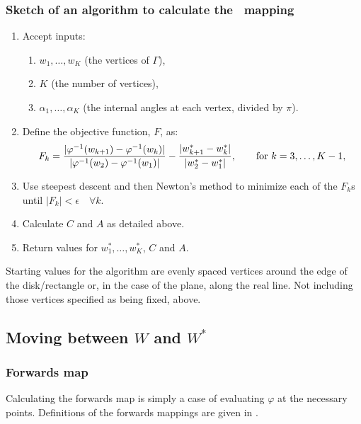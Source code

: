 \subsubsection{Sketch of an algorithm to calculate the \sch\ mapping}
\label{algorithmsketch}
\begin{enumerate}
\item Accept inputs:
   \begin{enumerate} 
      \item $w_1,\dots,w_K$ (the vertices of $\Gamma$),
      \item $K$ (the number of vertices),
      \item $\alpha_1,\dots,\alpha_K$ (the internal angles at each vertex, divided by $\pi$).
   \end{enumerate}
\item Define the objective function, $F$, as:
 \begin{equation*}
F_k=\frac{\vert \varphi^{-1}(w_{k+1}) -  \varphi^{-1}(w_k) \vert}{\vert \varphi^{-1}(w_2)-\varphi^{-1}(w_1)\vert} - \frac{\vert w^*_{k+1} - w^*_k\vert}{\vert w^*_2 - w^*_1\vert}, \qquad \text{for } k=3,\dots,K-1,
 \end{equation*}
\item Use steepest descent and then Newton's method to minimize each of the $F_k$s until $\vert F_k \vert < \epsilon \quad \forall k$. \item Calculate $C$ and $A$ as detailed above.
\item Return values for $w^*_1,\dots,w^*_K$, $C$ and $A$.
\end{enumerate}

Starting values for the algorithm are evenly spaced vertices around the edge of the disk/rectangle or, in the case of the plane, along the real line. Not including those vertices specified as being fixed, above.

\subsection{Moving between $W$ and $W^*$}

\subsubsection{Forwards map}

Calculating the forwards map is simply a case of evaluating $\varphi$ at the necessary points. Definitions of the forwards mappings are given in .

